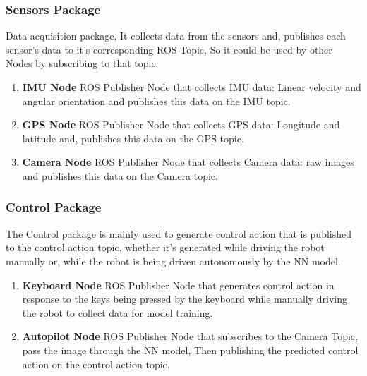 \subsubsection{Sensors Package}
\hspace{2cm}Data acquisition package, It collects data from the sensors and, publishes each sensor's data to it's corresponding ROS Topic, So it could be used by other Nodes by subscribing to that topic.
\begin{enumerate}
    \item \textbf{IMU Node}\newline
        ROS Publisher Node that collects IMU data: Linear velocity and angular orientation and publishes this data on the IMU topic.
    \item \textbf{GPS Node}\newline
        ROS Publisher Node that collects GPS data: Longitude and latitude and, publishes this data on the GPS topic.
    \item \textbf{Camera Node}\newline
        ROS Publisher Node that collects Camera data: raw images and publishes this data on the Camera topic.
\end{enumerate}

\subsubsection{Control Package}
\hspace{2cm}The Control package is mainly used to generate control action that is published to the control action topic, whether it's generated while driving the robot manually or, while the robot is being driven autonomously by the NN model.
\begin{enumerate}
    \item \textbf{Keyboard Node}\newline
    ROS Publisher Node that generates control action in response  to the keys being pressed by the keyboard while manually driving the robot to collect data for model training.
    \item \textbf{Autopilot Node}\newline
    ROS Publisher Node that subscribes to the Camera Topic, pass the image through the NN model, Then publishing the predicted control action on the control action topic.
\end{enumerate}

